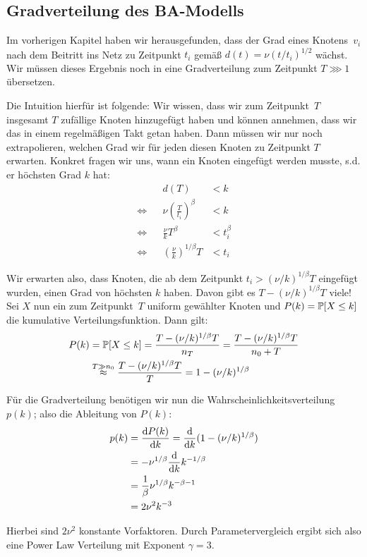 \subsection{Gradverteilung des BA-Modells}
Im vorherigen Kapitel haben wir herausgefunden, dass der Grad eines Knotens~$v_i$ nach dem Beitritt ins Netz zu Zeitpunkt $t_i$ gemäß $d(t) = \nu (t  / t_i)^{1/2}$ wächst.
Wir müssen dieses Ergebnis noch in eine Gradverteilung zum Zeitpunkt $T \ggg 1$ übersetzen.

Die Intuition hierfür ist folgende:
Wir wissen, dass wir zum Zeitpunkt~$T$ insgesamt $T$ zufällige Knoten hinzugefügt haben und können annehmen, dass wir das in einem regelmäßigen Takt getan haben.
Dann müssen wir nur noch extrapolieren, welchen Grad wir für jeden diesen Knoten zu Zeitpunkt $T$ erwarten.
Konkret fragen wir uns, wann ein Knoten eingefügt werden musste, s.d. er höchsten Grad $k$ hat:
\begin{align}
                    &  & d(T)                                   & < k         \\
    \Leftrightarrow &  & \nu \left(\frac{T}{t_i}\right)^\beta   & < k         \\
    \Leftrightarrow &  & \frac{\nu}{k} T^\beta                  & < t_i^\beta \\
    \Leftrightarrow &  & \left(\frac{\nu}{k}\right)^{1/\beta} T & < t_i
\end{align}

Wir erwarten also, dass Knoten, die ab dem Zeitpunkt $t_i > (\nu / k)^{1/\beta} T$ eingefügt wurden, einen Grad von höchsten $k$ haben.
Davon gibt es $T - (\nu / k)^{1/\beta} T$ viele!
Sei $X$ nun ein zum Zeitpunkt~$T$ uniform gewählter Knoten und $P(k) = \mathbb{P}\!\left[X \le k\right]$ die kumulative Verteilungsfunktion.
Dann gilt:
\begin{align}
    P(k) & = \mathbb{P}\!\left[X \le k\right] = \frac{T - (\nu / k)^{1/\beta} T}{n_T} = \frac{T - (\nu / k)^{1/\beta} T}{n_0 + T} \\
         & \stackrel{T \gg n_0}{\approx} \frac{T - (\nu / k)^{1/\beta} T}{T} = 1 - (\nu / k)^{1/\beta}
\end{align}

Für die Gradverteilung benötigen wir nun die Wahrscheinlichkeitsverteilung $p(k)$; also die Ableitung von $P(k)$:
\begin{align}
    p(k) & = \frac{\text d P(k)}{\text d k} = \frac{\text d}{\text d k} (1 - (\nu / k)^{1/\beta}) \\
         & = - \nu ^ {1/\beta}  \frac{\text d}{\text d k} k ^{-1/\beta}                       \\
         & = \frac{1}{\beta} \nu ^{1 / \beta} k^{-\beta - 1}                              \\
         & = 2 \nu^2 k^{-3}
\end{align}

Hierbei sind $2 \nu^2$ konstante Vorfaktoren.
Durch Parametervergleich ergibt sich also eine Power Law Verteilung mit Exponent $\gamma = 3$.

